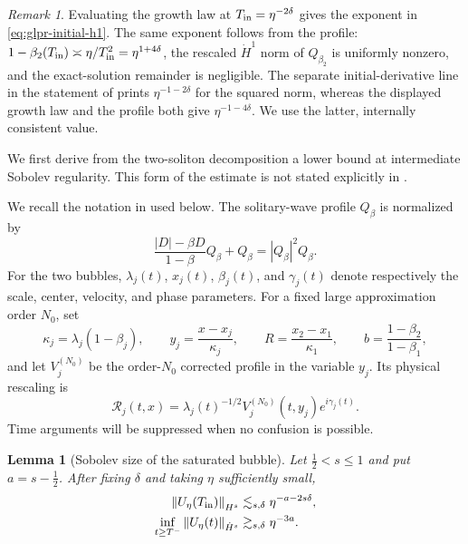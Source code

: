 \documentclass[11pt,reqno]{amsart}
\numberwithin{equation}{section}
\newtheorem{lemma}[theorem]{Lemma}
\theoremstyle{remark}
\newtheorem{remark}[theorem]{Remark}
\newcommand{\half}{\frac12}
\newcommand{\norm}[1]{\left\lVert #1\right\rVert}
\begin{document}
\begin{remark}\label{rem:glpr-normalization}
Evaluating the growth law \cite[(1.10)]{GLPR} at
$T_{\rm in}=\eta^{-2\delta}$ gives the exponent in
\eqref{eq:glpr-initial-h1}.  The same exponent follows from the profile:
$1-\beta_2(T_{\rm in})\asymp\eta/T_{\rm in}^2
=\eta^{1+4\delta}$, the rescaled $\dot H^1$ norm of $Q_{\beta_2}$ is
uniformly nonzero, and the exact-solution remainder is negligible.  The
separate initial-derivative line in the statement of \cite[Theorem~1.2]{GLPR}
prints $\eta^{-1-2\delta}$ for the squared norm, whereas the displayed growth
law and the profile both give $\eta^{-1-4\delta}$.  We use the latter,
internally consistent value.
\end{remark}

We first derive from the two-soliton decomposition a lower bound at
intermediate Sobolev regularity.  This form of the estimate is not stated
explicitly in \cite{GLPR}.

We recall the notation in \cite{GLPR} used below.  The solitary-wave profile $Q_\beta$
is normalized by
\[
 \frac{|D|-\beta D}{1-\beta}Q_\beta+Q_\beta=|Q_\beta|^2Q_\beta.
\]
For the two bubbles, $\lambda_j(t)$, $x_j(t)$, $\beta_j(t)$, and
$\gamma_j(t)$ denote respectively the scale, center, velocity, and phase
parameters.  For a fixed large approximation order $N_0$, set
\[
 \kappa_j=\lambda_j(1-\beta_j),\qquad
 y_j=\frac{x-x_j}{\kappa_j},\qquad
 R=\frac{x_2-x_1}{\kappa_1},\qquad
 b=\frac{1-\beta_2}{1-\beta_1},
\]
and let $V_j^{(N_0)}$ be the order-$N_0$ corrected profile in the variable
$y_j$.  Its physical rescaling is
\[
 \mathcal R_j(t,x)=\lambda_j(t)^{-1/2}
 V_j^{(N_0)}(t,y_j)e^{i\gamma_j(t)}.
\]
Time arguments will be suppressed when no confusion is possible.

\begin{lemma}[Sobolev size of the saturated bubble]\label{lem:glpr-hs}
Let $\half<s\leq1$ and put $a=s-\half$.  After fixing $\delta$ and taking
$\eta$ sufficiently small,
\begin{align}
 \norm{U_\eta(T_{\rm in})}_{H^s}
 &\lesssim_{s,\delta}
 \eta^{-a-2s\delta},\label{eq:initial-hs}\\
 \inf_{t\geq T^-}\norm{U_\eta(t)}_{\dot H^s}
 &\gtrsim_{s,\delta}\eta^{-3a}.
 \label{eq:saturated-hs}
\end{align}
\end{lemma}
\end{document}
